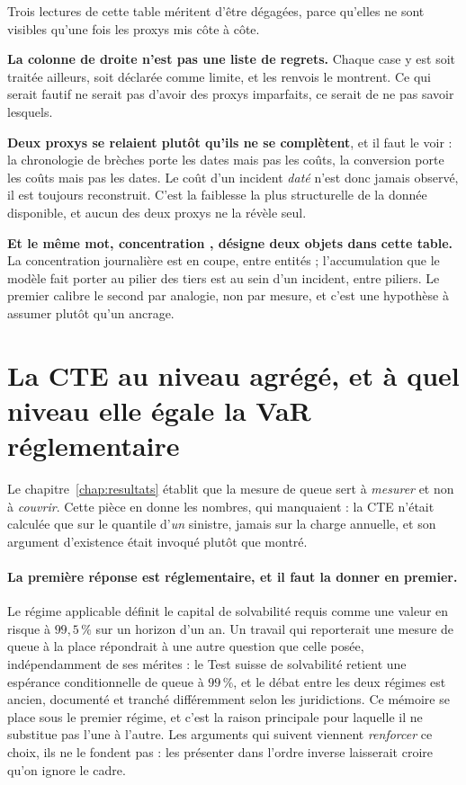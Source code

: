 \vspace{0.2cm}
\noindent Trois lectures de cette table méritent d'être dégagées, parce qu'elles ne sont visibles
qu'une fois les proxys mis côte à côte.

\textbf{La colonne de droite n'est pas une liste de regrets.} Chaque case y est soit traitée
ailleurs, soit déclarée comme limite, et les renvois le montrent. Ce qui serait fautif ne serait
pas d'avoir des proxys imparfaits, ce serait de ne pas savoir lesquels.

\textbf{Deux proxys se relaient plutôt qu'ils ne se complètent}, et il faut le voir : la
chronologie de brèches porte les dates mais pas les coûts, la conversion porte les coûts mais pas
les dates. Le coût d'un incident \emph{daté} n'est donc jamais observé, il est toujours
reconstruit. C'est la faiblesse la plus structurelle de la donnée disponible, et aucun des deux
proxys ne la révèle seul.

\textbf{Et le même mot, \og concentration \fg{}, désigne deux objets dans cette table.} La concentration
journalière est en coupe, entre entités ; l'accumulation que le modèle fait porter au pilier des
tiers est au sein d'un incident, entre piliers. Le premier calibre le second par analogie, non par
mesure, et c'est une hypothèse à assumer plutôt qu'un ancrage.


\section{La CTE au niveau agrégé, et à quel niveau elle égale la VaR réglementaire}
\label{sec:ann-cte}


Le chapitre~\ref{chap:resultats} établit que la mesure de queue sert à \emph{mesurer} et non à
\emph{couvrir}. Cette pièce en donne les nombres, qui manquaient : la CTE n'était calculée que sur
le quantile d'\emph{un} sinistre, jamais sur la charge annuelle, et son argument d'existence était
invoqué plutôt que montré.

\paragraph{La première réponse est réglementaire, et il faut la donner en premier.} Le régime
applicable définit le capital de solvabilité requis comme une valeur en risque à
$99{,}5\,\%$ sur un horizon d'un an. Un travail qui reporterait une mesure de queue à la place
répondrait à une autre question que celle posée, indépendamment de ses mérites : le Test suisse
de solvabilité retient une espérance conditionnelle de queue à $99\,\%$, et le débat entre les
deux régimes est ancien, documenté et tranché différemment selon les juridictions. Ce mémoire se
place sous le premier régime, et c'est la raison principale pour laquelle il ne substitue pas
l'une à l'autre. Les arguments qui suivent viennent \emph{renforcer} ce choix, ils ne le
fondent pas : les présenter dans l'ordre inverse laisserait croire qu'on ignore le cadre.

